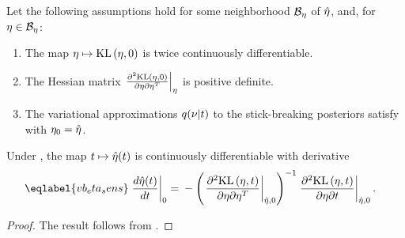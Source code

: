\begin{assu}
%
Let the following assumptions hold for some neighborhood $\mathcal{B}_\eta$
of $\hat\eta$, and, for $\eta \in \mathcal{B}_\eta$:
%
\begin{enumerate}
%
    \item {}
    The map $\eta \mapsto \mathrm{KL}\left(\eta, 0\right)$ is twice
    continuously differentiable.
%
\item{}
    The Hessian matrix $\left.\frac{\partial^2 \mathrm{KL}\left(\eta, 0\right)}{\partial \eta \partial \eta^T}\right\vert_{\eta}$ is positive definite.%
\item{} The variational approximations $q(\nu
\vert t)$ to the stick-breaking posteriors satisfy 
with $\eta_0 = \hat\eta$.
%
\end{enumerate}
%
\end{assu}


\begin{thm}
%
Under , the map $t \mapsto \hat\eta(t)$ is continuously
differentiable with derivative
%
\begin{align}\eqlabel{vb_eta_sens}
%
\fracat{d \etaopt(\t)}{d \t}{0} ={}&
    - \left( \fracat{\partial^2 \KL{\eta, \t}}
                    {\partial \eta \partial \eta^T}
                    {\etaopt, 0} \right)^{-1}
    \fracat{\partial^2 \KL{\eta, \t}}
           {\partial \eta \partial \t}
           {\etaopt, 0}.
%
\end{align}
%
\begin{proof}
%
The result follows from \citet[Theorem 3.3.1]{krantz:2012:implicit}.
%
\end{proof}
%
\end{thm}


